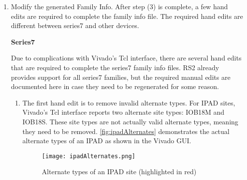 \begin {enumerate}
	\noindent As the listing shows, there are three arguments to the command:
	\begin{itemize}
	  \item \textbf{familyInfo.xml}: The file name to store the generated family
	  info. The file ending ``.xml" will be appended if it is not included.
	  \item \textbf{kintexu}: The Vivado family name.
	  \item \textbf{addedBels.txt} (Optional): When you are generating primitive
	  defs using VSRT (in step 1), a text file called ``addedBels.txt" is created in
	  your VSRT directory. This file contains a list of added VCC/GND BELs for
	  each family. To generate a complete Family Info file, pass this text file as
	  the third argument to the above command. The default argument is an empty
	  string so that no extra BELs will be added to the family info.
	\end{itemize}    
    
    \item Modify the generated Family Info. After step (3) is complete, a few
    hand edits are required to complete the family info file. The required hand
    edits are different between series7 and other devices.
    
    \bigbreak \noindent
	\begin{large}
	\textbf{Series7}
	\end{large}
    
    \noindent Due to complications with Vivado's Tcl interface, there are
    several hand edits that are required to complete the series7 family info
    files. RS2 already provides support for all series7 families, 
    but the required manual edits are documented here in case they need to
    be regenerated for some reason. 
    
    \begin{enumerate}
      \item The first hand edit is to remove invalid alternate types. For IPAD
      sites, Vivado's Tcl interface reports two alternate site types:
      IOB18M and IOB18S. These site types are not actually valid alternate
      types, meaning they need to be removed. \autoref{fig:ipadAlternates}
      demonstrates the actual alternate types of an IPAD as shown in the Vivado
      GUI.
      
      \begin{figure}[H]
        \centering
        \texttt{[image: ipadAlternates.png]}
        \caption{Alternate types of an IPAD site (highlighted in red)}
        \label{fig:ipadAlternates}
      \end{figure}
      

\end{enumerate}
\end{enumerate}

